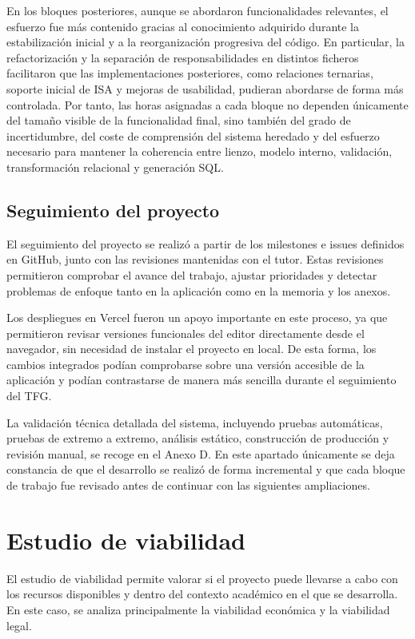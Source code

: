 En los bloques posteriores, aunque se abordaron funcionalidades relevantes, el esfuerzo fue más contenido gracias al conocimiento adquirido durante la estabilización inicial y a la reorganización progresiva del código. En particular, la refactorización y la separación de responsabilidades en distintos ficheros facilitaron que las implementaciones posteriores, como relaciones ternarias, soporte inicial de ISA y mejoras de usabilidad, pudieran abordarse de forma más controlada. Por tanto, las horas asignadas a cada bloque no dependen únicamente del tamaño visible de la funcionalidad final, sino también del grado de incertidumbre, del coste de comprensión del sistema heredado y del esfuerzo necesario para mantener la coherencia entre lienzo, modelo interno, validación, transformación relacional y generación SQL.

\subsection{Seguimiento del proyecto}

El seguimiento del proyecto se realizó a partir de los milestones e issues definidos en GitHub, junto con las revisiones mantenidas con el tutor. Estas revisiones permitieron comprobar el avance del trabajo, ajustar prioridades y detectar problemas de enfoque tanto en la aplicación como en la memoria y los anexos.

Los despliegues en Vercel fueron un apoyo importante en este proceso, ya que permitieron revisar versiones funcionales del editor directamente desde el navegador, sin necesidad de instalar el proyecto en local. De esta forma, los cambios integrados podían comprobarse sobre una versión accesible de la aplicación y podían contrastarse de manera más sencilla durante el seguimiento del TFG.

La validación técnica detallada del sistema, incluyendo pruebas automáticas, pruebas de extremo a extremo, análisis estático, construcción de producción y revisión manual, se recoge en el Anexo D. En este apartado únicamente se deja constancia de que el desarrollo se realizó de forma incremental y que cada bloque de trabajo fue revisado antes de continuar con las siguientes ampliaciones.

\section{Estudio de viabilidad}

El estudio de viabilidad permite valorar si el proyecto puede llevarse a cabo con los recursos disponibles y dentro del contexto académico en el que se desarrolla. En este caso, se analiza principalmente la viabilidad económica y la viabilidad legal.


